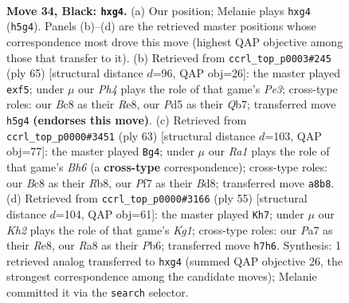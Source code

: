 \documentclass[11pt]{article}
\begin{document}
\clearpage

\begin{figure}[p]\centering
\begin{subfigure}{0.46\textwidth}\centering
\resizebox{\linewidth}{!}{%
\newchessgame
\chessboard[
  setfen={r1b2r2/pp3p1k/n4Bp1/q2p3p/B5PP/1P6/R1PNQP2/1N2R1K1 b - - 0 34},
  showmover=false,
  pgfstyle=straightmove, color=movearrow, markmove={h5-g4}
]}
\caption{}
\end{subfigure}\hfill
\begin{subfigure}{0.46\textwidth}\centering
\resizebox{\linewidth}{!}{%
\newchessgame
\chessboard[
  setfen={4rbk1/1q3ppp/n1p1p3/3pPP2/3B3P/1P3Q2/r1P1RNP1/5R1K b - - 0 33},
  showmover=false,
  pgfstyle=straightmove, color=movearrow, markmove={e6-f5}
]}
\caption{}
\end{subfigure}
\\[4pt]
\begin{subfigure}{0.46\textwidth}\centering
\resizebox{\linewidth}{!}{%
\newchessgame
\chessboard[
  setfen={1r1br2k/5ppp/p2p4/2qNn1PP/1p1NB3/1P5b/P1PQ4/1K2R1R1 b - - 4 32},
  showmover=false,
  pgfstyle=straightmove, color=movearrow, markmove={h3-g4}
]}
\caption{}
\end{subfigure}\hfill
\begin{subfigure}{0.46\textwidth}\centering
\resizebox{\linewidth}{!}{%
\newchessgame
\chessboard[
  setfen={4r1k1/5p2/pp1r1bp1/3p3p/P1qNn3/2P1B2P/1PQ2PP1/3RR1K1 b - - 5 28},
  showmover=false,
  pgfstyle=straightmove, color=movearrow, markmove={g8-h7}
]}
\caption{}
\end{subfigure}
\caption{\textbf{Move 34, Black: \texttt{hxg4}.} (a) Our position; Melanie plays \texttt{hxg4} (\texttt{h5g4}). Panels (b)--(d) are the retrieved master positions whose correspondence most drove this move (highest QAP objective among those that transfer to it). (b) Retrieved from \texttt{ccrl\_top\_p0003\#245} (ply 65) [structural distance $d$=96, QAP obj=26]: the master played \texttt{exf5}; under $\mu$ our \emph{Ph4} plays the role of that game's \emph{Pe3}; cross-type roles: our \emph{B}c8 as their \emph{R}e8, our \emph{P}d5 as their \emph{Q}b7; transferred move \texttt{h5g4} \textbf{(endorses this move)}. (c) Retrieved from \texttt{ccrl\_top\_p0000\#3451} (ply 63) [structural distance $d$=103, QAP obj=77]: the master played \texttt{Bg4}; under $\mu$ our \emph{Ra1} plays the role of that game's \emph{Bh6} (a \textbf{cross-type} correspondence); cross-type roles: our \emph{B}c8 as their \emph{R}b8, our \emph{P}f7 as their \emph{B}d8; transferred move \texttt{a8b8}. (d) Retrieved from \texttt{ccrl\_top\_p0000\#3166} (ply 55) [structural distance $d$=104, QAP obj=61]: the master played \texttt{Kh7}; under $\mu$ our \emph{Kh2} plays the role of that game's \emph{Kg1}; cross-type roles: our \emph{P}a7 as their \emph{R}e8, our \emph{R}a8 as their \emph{P}b6; transferred move \texttt{h7h6}. Synthesis: 1 retrieved analog transferred to \texttt{hxg4} (summed QAP objective 26, the strongest correspondence among the candidate moves); Melanie committed it via the \texttt{search} selector.}
\label{fig:thought-m67}
\end{figure}
\end{document}
